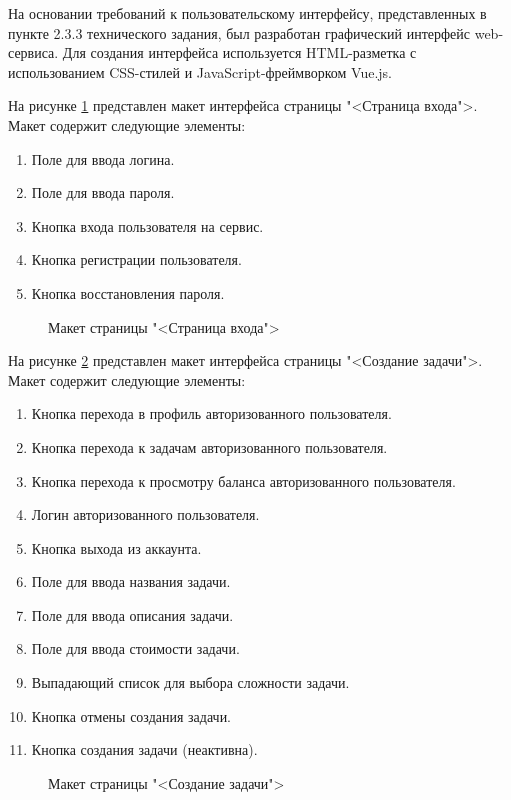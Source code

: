 На основании требований к пользовательскому интерфейсу, представленных в пункте 2.3.3 технического задания, был разработан графический интерфейс web-сервиса. Для создания интерфейса используется HTML-разметка с использованием CSS-стилей и JavaScript-фреймворком Vue.js.

На рисунке \ref{m1:image} представлен макет интерфейса страницы "<Страница входа">. Макет содержит следующие элементы:

\begin{enumerate}
	\item Поле для ввода логина.
	\item Поле для ввода пароля.
	\item Кнопка входа пользователя на сервис.
	\item Кнопка регистрации пользователя.
	\item Кнопка восстановления пароля.
\end{enumerate}
\clearpage

\begin{figure}[ht]
	\caption{Макет страницы "<Страница входа">}
	\label{m1:image}
\end{figure}

На рисунке \ref{m2:image} представлен макет интерфейса страницы "<Создание задачи">. Макет содержит следующие элементы:

\begin{enumerate}
	\item Кнопка перехода в профиль авторизованного пользователя.
	\item Кнопка перехода к задачам авторизованного пользователя.
	\item Кнопка перехода к просмотру баланса авторизованного пользователя.
	\item Логин авторизованного пользователя.
	\item Кнопка выхода из аккаунта.
	\item Поле для ввода названия задачи.
	\item Поле для ввода описания задачи.
	\item Поле для ввода стоимости задачи.
	\item Выпадающий список для выбора сложности задачи.
	\item Кнопка отмены создания задачи.
	\item Кнопка создания задачи (неактивна).
\end{enumerate}
\clearpage

\begin{figure}[ht]
	\caption{Макет страницы "<Создание задачи">}
	\label{m2:image}
\end{figure}

